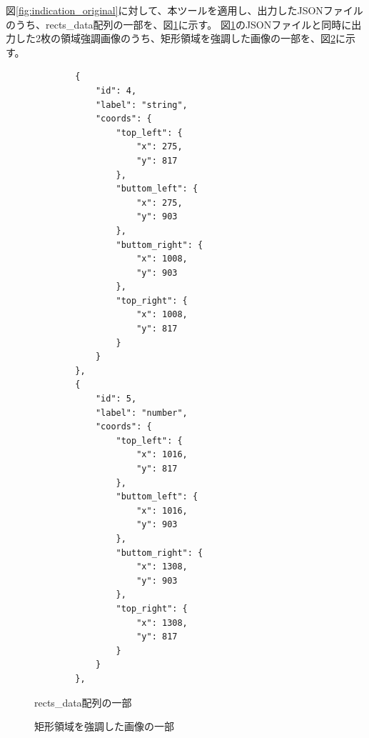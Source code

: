 図\ref{fig:indication_original}に対して、本ツールを適用し、出力したJSONファイルのうち、rects\_data配列の一部を、図\ref{fig:rects_data_json}に示す。
図\ref{fig:rects_data_json}のJSONファイルと同時に出力した2枚の領域強調画像のうち、矩形領域を強調した画像の一部を、図\ref{fig:highlighted_rects_part}に示す。

\lstset{language=}
\begin{figure}[t]
    \begin{lstlisting}
        {
            "id": 4,
            "label": "string",
            "coords": {
                "top_left": {
                    "x": 275,
                    "y": 817
                },
                "buttom_left": {
                    "x": 275,
                    "y": 903
                },
                "buttom_right": {
                    "x": 1008,
                    "y": 903
                },
                "top_right": {
                    "x": 1008,
                    "y": 817
                }
            }
        },
        {
            "id": 5,
            "label": "number",
            "coords": {
                "top_left": {
                    "x": 1016,
                    "y": 817
                },
                "buttom_left": {
                    "x": 1016,
                    "y": 903
                },
                "buttom_right": {
                    "x": 1308,
                    "y": 903
                },
                "top_right": {
                    "x": 1308,
                    "y": 817
                }
            }
        },
    \end{lstlisting}
    \caption{rects\_data配列の一部}\label{fig:rects_data_json}
\end{figure}

\begin{figure}[t]
    \begin{center}
        \caption{矩形領域を強調した画像の一部}
        \label{fig:highlighted_rects_part}
    \end{center}
\end{figure}

